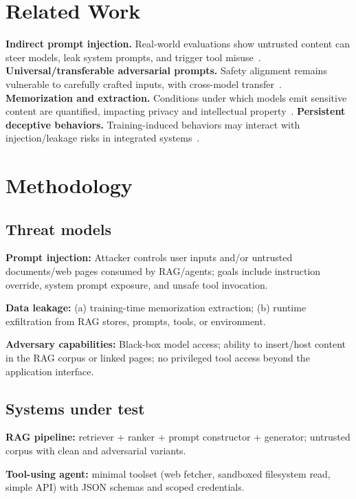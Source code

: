 \documentclass[11pt]{article}
\begin{document}
\section{Related Work}
\textbf{Indirect prompt injection.} Real-world evaluations show untrusted content can steer models, leak system prompts, and trigger tool misuse~\cite{greshake2023prompt}.\newline
\textbf{Universal/transferable adversarial prompts.} Safety alignment remains vulnerable to carefully crafted inputs, with cross-model transfer~\cite{zou2023universal}.\newline
\textbf{Memorization and extraction.} Conditions under which models emit sensitive content are quantified, impacting privacy and intellectual property~\cite{carlini2021extracting,carlini2022quantifying}.\newline
\textbf{Persistent deceptive behaviors.} Training-induced behaviors may interact with injection/leakage risks in integrated systems~\cite{anthropic2024sleeper}.

\section{Methodology}
\subsection{Threat models}
\textbf{Prompt injection:} Attacker controls user inputs and/or untrusted documents/web pages consumed by RAG/agents; goals include instruction override, system prompt exposure, and unsafe tool invocation.

\textbf{Data leakage:} (a) training-time memorization extraction; (b) runtime exfiltration from RAG stores, prompts, tools, or environment.

\textbf{Adversary capabilities:} Black-box model access; ability to insert/host content in the RAG corpus or linked pages; no privileged tool access beyond the application interface.

\subsection{Systems under test}
\textbf{RAG pipeline:} retriever + ranker + prompt constructor + generator; untrusted corpus with clean and adversarial variants.

\textbf{Tool-using agent:} minimal toolset (web fetcher, sandboxed filesystem read, simple API) with JSON schemas and scoped credentials.
\end{document}
